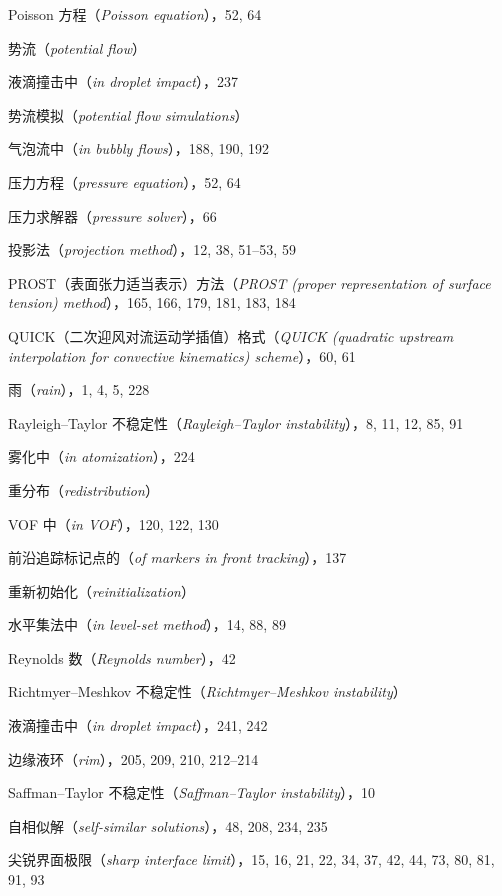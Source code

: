 \documentclass[11pt,a4paper,openany,fontset=none]{ctexbook}
\begin{document}
Poisson 方程（\textit{Poisson equation}），52, 64\par
势流（\textit{potential flow}）\par
\quad 液滴撞击中（\textit{in droplet impact}），237\par
势流模拟（\textit{potential flow simulations}）\par
\quad 气泡流中（\textit{in bubbly flows}），188, 190, 192\par
压力方程（\textit{pressure equation}），52, 64\par
压力求解器（\textit{pressure solver}），66\par
投影法（\textit{projection method}），12, 38, 51--53, 59\par
PROST（表面张力适当表示）方法（\textit{PROST (proper representation of surface tension) method}），165, 166, 179, 181, 183, 184\par
QUICK（二次迎风对流运动学插值）格式（\textit{QUICK (quadratic upstream interpolation for convective kinematics) scheme}），60, 61\par
雨（\textit{rain}），1, 4, 5, 228\par
Rayleigh--Taylor 不稳定性（\textit{Rayleigh--Taylor instability}），8, 11, 12, 85, 91\par
\quad 雾化中（\textit{in atomization}），224\par
重分布（\textit{redistribution}）\par
\quad VOF 中（\textit{in VOF}），120, 122, 130\par
\quad 前沿追踪标记点的（\textit{of markers in front tracking}），137\par
重新初始化（\textit{reinitialization}）\par
\quad 水平集法中（\textit{in level-set method}），14, 88, 89\par
Reynolds 数（\textit{Reynolds number}），42\par
Richtmyer--Meshkov 不稳定性（\textit{Richtmyer--Meshkov instability}）\par
\quad 液滴撞击中（\textit{in droplet impact}），241, 242\par
边缘液环（\textit{rim}），205, 209, 210, 212--214\par
Saffman--Taylor 不稳定性（\textit{Saffman--Taylor instability}），10\par
自相似解（\textit{self-similar solutions}），48, 208, 234, 235\par
尖锐界面极限（\textit{sharp interface limit}），15, 16, 21, 22, 34, 37, 42, 44, 73, 80, 81, 91, 93\par
\end{document}
